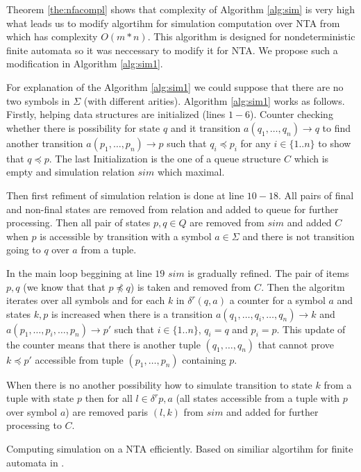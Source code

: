 \documentclass[a4paper, 12pt]{article}
\begin{document}
Theorem \ref{the:nfacompl} shows that complexity of Algorithm \ref{alg:sim} is very high what leads us
to modify algortihm for simulation computation over NTA from \cite{ilie:nta} which has complexity $O(m*n)$.
This algorithm is designed for nondeterministic finite automata so it was neccessary to modify it for NTA.
We propose such a modification in Algorithm \ref{alg:sim1}.

For explanation of the Algorithm \ref{alg:sim1} we could suppose that there are no two symbols in $\Sigma$ (with different arities).
Algorithm \ref{alg:sim1} works as follows.
Firstly, helping data structures are initialized (lines $1-6$).
Counter checking whether there is possibility for state $q$ and it transition $a(q_1, \ldots, q_n) \rightarrow q$ 
to find another transition $a(p_1, \ldots, p_n) \rightarrow p$ such that $q_i \preceq p_i$ for any $i \in \{1..n\}$ to show that $q \preceq p$.
The last Initialization is the one of a queue structure $C$ which is empty and simulation relation $sim$ which maximal.

Then first refiment of simulation relation is done at line $10-18$.
All pairs of final and non-final states are removed from relation and added to queue for further processing.
Then all pair of states $p,q \in Q$ are removed from $sim$ and added $C$ when $p$ is accessible by transition with a symbol $a \in \Sigma$
and there is not transition going to $q$ over $a$ from a tuple.

In the main loop beggining at line $19$ $sim$ is gradually refined.
The pair of items $p,q$ (we know that that $p \not\preceq q$) is taken and removed from $C$.
Then the algoritm iterates over all symbols and for each $k$ in $\delta^r(q,a)$ a counter for a symbol $a$ and states $k,p$
is increased when there is a transition $a(q_1, \ldots, q_i, \ldots, q_n) \rightarrow k$ and $a(p_1, \ldots, p_i, \ldots, p_n) \rightarrow p'$
such that $i\in \{1..n\}$, $q_i = q$ and $p_i = p$.
This update of the counter means that there is another tuple $(q_1, \ldots,q_n)$ that cannot prove $k \preceq p'$
accessible from tuple $(p_1, \ldots, p_n)$ containing $p$.

When there is no another possibility how to simulate transition to state $k$ from a tuple with state $p$
then for all $l \in \delta^r{p,a}$ (all states accessible from a tuple with $p$ over symbol $a$) are
removed paris $(l,k)$ from $sim$ and added for further processing to $C$.


\begin{algorithm}[H]
	
	 \caption{Computing simulation on a NTA efficiently. Based on similiar algortihm for finite automata in \cite{ilie:nfa}.}
\label{alg:sim1}
\end{algorithm}
\end{document}
